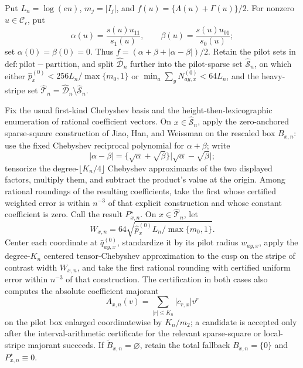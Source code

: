 Put \(L_n=\log(en)\), \(m_j=\lvert I_j\rvert\), and \(f(u)=\{\Lambda(u)+\Gamma(u)\}/2\).  For nonzero \(u\in\mathcal C_\epsilon\), put
\[
 \alpha(u)=\frac{s(u)u_{11}}{s_1(u)},\qquad
 \beta(u)=\frac{s(u)u_{01}}{s_0(u)};
\]
set \(\alpha(0)=\beta(0)=0\).  Thus \(f=(\alpha+\beta+\lvert\alpha-\beta\rvert)/2\).  Retain the pilot sets in \(\mathrm{def:pilot-partition}\), and split \(\widehat{\mathcal D}_n\) further into the pilot-sparse set \(\widehat{\mathcal S}_n\), on which either \(\widehat p_x^{(0)}<256L_n/\max\{m_0,1\}\) or \(\min_a\sum_yN^{(0)}_{ay,x}<64L_n\), and the heavy-stripe set \(\widehat{\mathcal T}_n=\widehat{\mathcal D}_n\setminus\widehat{\mathcal S}_n\).

Fix the usual first-kind Chebyshev basis and the height-then-lexicographic enumeration of rational coefficient vectors.  On \(x\in\widehat{\mathcal S}_n\), apply the zero-anchored sparse-square construction of Jiao, Han, and Weissman on the rescaled box \(B_{x,n}\): use the fixed Chebyshev reciprocal polynomial for \(\alpha+\beta\); write
\[
 \lvert\alpha-\beta\rvert
 =\{\sqrt\alpha+\sqrt\beta\}
  \lvert\sqrt\alpha-\sqrt\beta\rvert;
\]
tensorize the degree-\(\lfloor K_n/4\rfloor\) Chebyshev approximants of the two displayed factors, multiply them, and subtract the product's value at the origin.  Among rational roundings of the resulting coefficients, take the first whose certified weighted error is within \(n^{-3}\) of that explicit construction and whose constant coefficient is zero.  Call the result \(P^\star_{x,n}\).  On \(x\in\widehat{\mathcal T}_n\), let
\[
 W_{x,n}=64\sqrt{\widehat p_x^{(0)}L_n/\max\{m_0,1\}}.
\]
Center each coordinate at \(\widehat q^{(0)}_{ay,x}\), standardize it by its pilot radius \(w_{ay,x}\), apply the degree-\(K_n\) centered tensor-Chebyshev approximation to the cusp on the stripe of contrast width \(W_{x,n}\), and take the first rational rounding with certified uniform error within \(n^{-3}\) of that construction.  The certification in both cases also computes the absolute coefficient majorant
\[
 A_{x,n}(v)=\sum_{\lvert r\rvert\le K_n}\lvert c_{r,x}\rvert v^r
\]
on the pilot box enlarged coordinatewise by \(K_n/m_2\); a candidate is accepted only after the interval-arithmetic certificate for the relevant sparse-square or local-stripe majorant succeeds.  If \(\widetilde B_{x,n}=\varnothing\), retain the total fallback \(B_{x,n}=\{0\}\) and \(P^\star_{x,n}\equiv0\).

